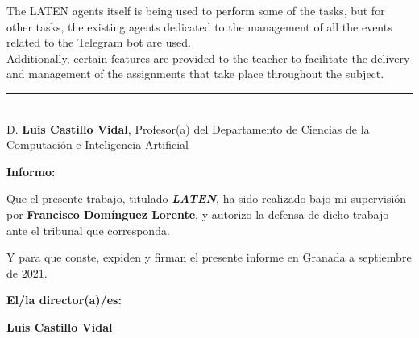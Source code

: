	The LATEN agents itself is being used to perform some of the tasks, but for other tasks, the existing agents dedicated to the management of all the events related to the Telegram bot are used.\\
	
	Additionally, certain features are provided to the teacher to facilitate the delivery and management of the assignments that take place throughout the subject.

\cleardoublepage

\thispagestyle{empty}

\noindent\rule[-1ex]{\textwidth}{2pt}\\[4.5ex]

D. \textbf{Luis Castillo Vidal}, Profesor(a) del Departamento de Ciencias de la Computación e Inteligencia Artificial

\vspace{0.5cm}

\textbf{Informo:}

\vspace{0.5cm}

Que el presente trabajo, titulado \textit{\textbf{LATEN}},
ha sido realizado bajo mi supervisión por \textbf{Francisco Domínguez Lorente}, y autorizo la defensa de dicho trabajo ante el tribunal
que corresponda.

\vspace{0.5cm}

Y para que conste, expiden y firman el presente informe en Granada a septiembre de 2021.

\vspace{1cm}

\textbf{El/la director(a)/es: }

\vspace{5cm}

\noindent \textbf{Luis Castillo Vidal}